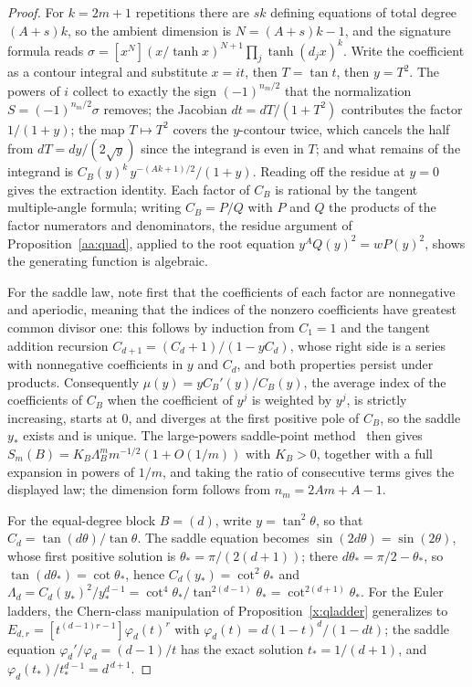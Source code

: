 \documentclass[11pt]{article}
\theoremstyle{definition}
\begin{document}
\begin{proof}
For $k=2m+1$ repetitions there are $sk$ defining equations of total degree $(A+s)k$, so the ambient dimension is $N=(A+s)k-1$, and the signature formula reads $\sigma=[x^N](x/\tanh x)^{N+1}\prod_j\tanh(d_jx)^k$.  Write the coefficient as a contour integral and substitute $x=it$, then $T=\tan t$, then $y=T^2$.  The powers of $i$ collect to exactly the sign $(-1)^{n_m/2}$ that the normalization $S=(-1)^{n_m/2}\sigma$ removes; the Jacobian $dt=dT/(1+T^2)$ contributes the factor $1/(1+y)$; the map $T\mapsto T^2$ covers the $y$-contour twice, which cancels the half from $dT=dy/(2\sqrt y)$ since the integrand is even in $T$; and what remains of the integrand is $C_B(y)^k\,y^{-(Ak+1)/2}/(1+y)$.  Reading off the residue at $y=0$ gives the extraction identity.  Each factor of $C_B$ is rational by the tangent multiple-angle formula; writing $C_B=P/Q$ with $P$ and $Q$ the products of the factor numerators and denominators, the residue argument of Proposition~\ref{aa:quad}, applied to the root equation $y^AQ(y)^2=wP(y)^2$, shows the generating function is algebraic.

For the saddle law, note first that the coefficients of each factor are nonnegative and aperiodic, meaning that the indices of the nonzero coefficients have greatest common divisor one: this follows by induction from $C_1=1$ and the tangent addition recursion $C_{d+1}=(C_d+1)/(1-yC_d)$, whose right side is a series with nonnegative coefficients in $y$ and $C_d$, and both properties persist under products.  Consequently $\mu(y)=yC_B'(y)/C_B(y)$, the average index of the coefficients of $C_B$ when the coefficient of $y^j$ is weighted by $y^j$, is strictly increasing, starts at $0$, and diverges at the first positive pole of $C_B$, so the saddle $y_{*}$ exists and is unique.  The large-powers saddle-point method~\cite{FS09} then gives $S_m(B)=K_B\Lambda_B^mm^{-1/2}(1+O(1/m))$ with $K_B>0$, together with a full expansion in powers of $1/m$, and taking the ratio of consecutive terms gives the displayed law; the dimension form follows from $n_m=2Am+A-1$.

For the equal-degree block $B=(d)$, write $y=\tan^2\theta$, so that $C_d=\tan(d\theta)/\tan\theta$.  The saddle equation becomes $\sin(2d\theta)=\sin(2\theta)$, whose first positive solution is $\theta_{*}=\pi/(2(d+1))$; there $d\theta_{*}=\pi/2-\theta_{*}$, so $\tan(d\theta_{*})=\cot\theta_{*}$, hence $C_d(y_{*})=\cot^2\theta_{*}$ and $\Lambda_d=C_d(y_{*})^2/y_{*}^{d-1}=\cot^4\theta_{*}/\tan^{2(d-1)}\theta_{*}=\cot^{2(d+1)}\theta_{*}$.  For the Euler ladders, the Chern-class manipulation of Proposition~\ref{x:qladder} generalizes to $E_{d,r}=[t^{(d-1)r-1}]\varphi_d(t)^r$ with $\varphi_d(t)=d(1-t)^d/(1-dt)$; the saddle equation $\varphi_d'/\varphi_d=(d-1)/t$ has the exact solution $t_{*}=1/(d+1)$, and $\varphi_d(t_{*})/t_{*}^{d-1}=d^{\,d+1}$.
\end{proof}
\end{document}
